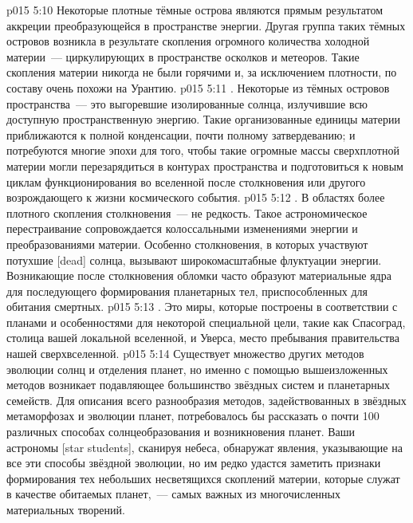 \vs p015 5:10 Некоторые плотные тёмные острова являются прямым результатом аккреции преобразующейся в пространстве энергии. Другая группа таких тёмных островов возникла в результате скопления огромного количества холодной материи~--- циркулирующих в пространстве осколков и метеоров. Такие скопления материи никогда не были горячими и, за исключением плотности, по составу очень похожи на Урантию.
\vs p015 5:11 . Некоторые из тёмных островов пространства~--- это выгоревшие изолированные солнца, излучившие всю доступную пространственную энергию. Такие организованные единицы материи приближаются к полной конденсации, почти полному затвердеванию; и потребуются многие эпохи для того, чтобы такие огромные массы сверхплотной материи могли перезарядиться в контурах пространства и подготовиться к новым циклам функционирования во вселенной после столкновения или другого возрождающего к жизни космического события.
\vs p015 5:12 . В областях более плотного скопления столкновения~--- не редкость. Такое астрономическое перестраивание сопровождается колоссальными изменениями энергии и преобразованиями материи. Особенно столкновения, в которых участвуют потухшие [dead] солнца, вызывают широкомасштабные флуктуации энергии. Возникающие после столкновения обломки часто образуют материальные ядра для последующего формирования планетарных тел, приспособленных для обитания смертных.
\vs p015 5:13 . Это миры, которые построены в соответствии с планами и особенностями для некоторой специальной цели, такие как Спасоград, столица вашей локальной вселенной, и Уверса, место пребывания правительства нашей сверхвселенной.
\vs p015 5:14 \pc Существует множество других методов эволюции солнц и отделения планет, но именно с помощью вышеизложенных методов возникает подавляющее большинство звёздных систем и планетарных семейств. Для описания всего разнообразия методов, задействованных в звёздных метаморфозах и эволюции планет, потребовалось бы рассказать о почти 100 различных способах солнцеобразования и возникновения планет. Ваши астрономы [star students], сканируя небеса, обнаружат явления, указывающие на все эти способы звёздной эволюции, но им редко удастся заметить признаки формирования тех небольших несветящихся скоплений материи, которые служат в качестве обитаемых планет,~--- самых важных из многочисленных материальных творений.
